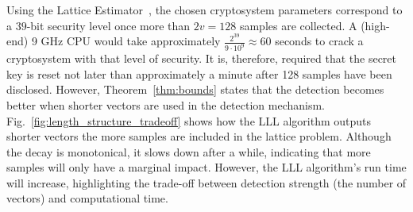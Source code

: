 \documentclass[journal, twoside, web]{ieeecolorpreprint}
\begin{document}



Using the Lattice Estimator~\cite{Albrecht2015}, the chosen cryptosystem parameters correspond to a $39$-bit security level once more than $2v = 128$ samples are collected. A (high-end) 9 GHz CPU would take approximately $\frac{2^{39}}{9 \cdot 10^9} \approx 60$ seconds to crack a cryptosystem with that level of security. It is, therefore, required that the secret key is reset not later than approximately a minute after 128 samples have been disclosed. However, Theorem~\ref{thm:bounds} states that the detection becomes better when shorter vectors are used in the detection mechanism. Fig.~\ref{fig:length_structure_tradeoff} shows how the LLL algorithm outputs shorter vectors the more samples are included in the lattice problem. Although the decay is monotonical, it slows down after a while, indicating that more samples will only have a marginal impact. However, the LLL algorithm's run time will increase, highlighting the trade-off between detection strength (the number of vectors) and computational time.
\end{document}
